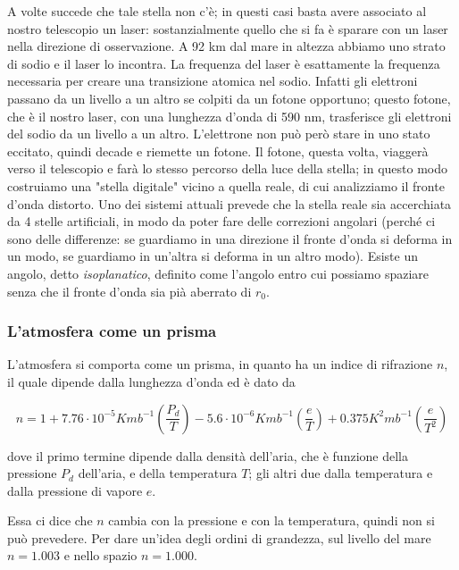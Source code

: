 A volte succede che tale stella non c'è; in questi casi basta avere associato al nostro telescopio un laser: sostanzialmente quello che si fa è sparare con un laser nella direzione di osservazione. A 92 km dal mare in altezza abbiamo uno strato di sodio e il laser lo incontra. La frequenza del laser è esattamente la frequenza necessaria per creare una transizione atomica nel sodio. Infatti gli elettroni passano da un livello a un altro se colpiti da un fotone opportuno; questo fotone, che è il nostro laser, con una lunghezza d'onda di 590 nm, trasferisce gli elettroni del sodio da un livello a un altro. L'elettrone non può però stare in uno stato eccitato, quindi decade e riemette un fotone. Il fotone, questa volta, viaggerà verso il telescopio e farà lo stesso percorso della luce della stella; in questo modo costruiamo una "stella digitale" vicino a quella reale, di cui analizziamo il fronte d'onda distorto. Uno dei sistemi attuali prevede che la stella reale sia accerchiata da 4 stelle artificiali, in modo da poter fare delle correzioni angolari (perché ci sono delle differenze: se guardiamo in una direzione il fronte d'onda si deforma in un modo, se guardiamo in un'altra si deforma in un altro modo). Esiste un angolo, detto \textit{isoplanatico}, definito come l'angolo entro cui possiamo spaziare senza che il fronte d'onda sia pià aberrato di $r_0$.
 
\subsubsection{L'atmosfera come un prisma}
L'atmosfera si comporta come un prisma, in quanto ha un indice di rifrazione $n$, il quale dipende dalla lunghezza d'onda ed è dato da

$$n=1 + 7.76 \cdot 10^{-5} K mb^{-1} \left( \frac{P_d}{T} \right) - 5.6 \cdot 10^{-6} K mb^{-1} \left( \frac{e}{T} \right) + 0.375 K^2 mb^{-1} \left( \frac{e}{T^2} \right)$$

dove il primo termine dipende dalla densità dell'aria, che è funzione della pressione $P_d$ dell'aria, e della temperatura $T$; gli altri due dalla temperatura e dalla pressione di vapore $e$.

Essa ci dice che $n$ cambia con la pressione e con la temperatura, quindi non si può prevedere. Per dare un'idea degli ordini di grandezza, sul livello del mare $n=1.003$ e nello spazio $n=1.000$.



